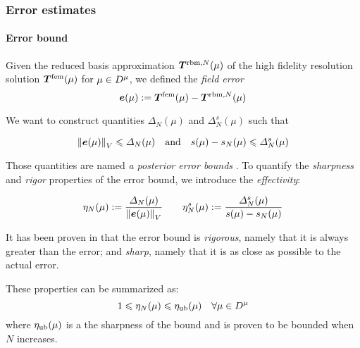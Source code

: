 \subsubsection{Error estimates}
\label{sec:rbm-error-estimates}



\paragraph*{Error bound}

Given the reduced basis approximation $\vct{T}^{\rbm, N}(\mu)$ of the high fidelity resolution solution $\vct{T}^\fem(\mu)$ for $\mu\in D^{\mu}$, we defined the \emph{field error}
\begin{equation}
    \vct{e}(\mu):= \vct{T}^\fem(\mu) - \vct{T}^{\rbm, N}(\mu)
    \label{eq:error-field}
\end{equation}

We want to construct quantities $\Delta_N(\mu)$ and $\Delta_N^s(\mu)$ such that

\begin{equation}
    \norm{\vct{e}(\mu)}{V} \leqslant \Delta_N(\mu) \quad\text{and}\quad s(\mu)-s_N(\mu) \leqslant \Delta_N^s(\mu)
\end{equation}

Those quantities are named \emph{a posterior error bounds} \cite{10.1115/1.1448332,Rozza2007}.
To quantify the \emph{sharpness} and \emph{rigor} properties of the error bound, we introduce the \emph{effectivity}:

\begin{equation}
    \eta_N(\mu):= \dfrac{\Delta_N(\mu)}{\norm{\vct{e}(\mu)}{V}}
    \qquad
    \eta_N^s(\mu):= \dfrac{\Delta_N^s(\mu)}{s(\mu)-s_N(\mu)}
    \label{eq:effectivity}
\end{equation}

It has been proven in \cite{10.1115/1.1448332} that the error bound is \emph{rigorous}, namely that it is always greater than the error;
and \emph{sharp}, namely that it is as close as possible to the actual error.

These properties can be summarized as:
\begin{equation}
    1 \leqslant \eta_N(\mu) \leqslant \eta_{\mathrm{ub}}(\mu) \quad \forall \mu\in D^{\mu}
\end{equation}
where $\eta_{\mathrm{ub}}(\mu)$ is a the sharpness of the bound and is proven to be bounded \cite{10.1115/1.1448332} when $N$ increases.

